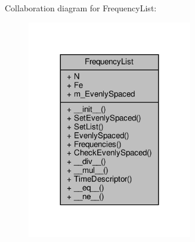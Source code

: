 Collaboration diagram for Frequency\+List\+:
\nopagebreak
\begin{figure}[H]
\begin{center}
\leavevmode
\includegraphics[width=203pt]{classSignalIntegrity_1_1FrequencyDomain_1_1FrequencyList_1_1FrequencyList__coll__graph}
\end{center}
\end{figure}
